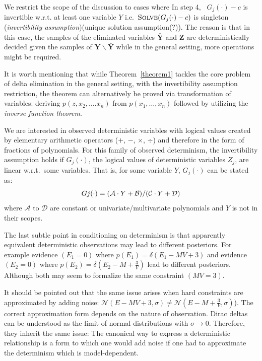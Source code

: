 \documentclass{article}
\newcommand{\bvec}[1]{\textbf{#1}}
\newcommand{\pr}{p}
\begin{document}
We restrict the scope of the discussion to cases where  
In step 4, \ $G_j(\cdot) - c$ is invertible w.r.t. at least one variable $Y$ 
i.e.\ $\textsc{Solve}(G_j(\cdot)-c)$ is singleton (\emph{invertibility assumption}){\color{red}(unique solution assumption(?))}.
The reason is that in this case, 
 the samples of the eliminated variables $\bar{\bvec{Y}}$ and $\bvec{Z}$ 
are deterministically decided given the samples of $\bvec{Y}\backslash \bar{\bvec{Y}}$ while in the general setting, more operations might be required.
%

It is worth mentioning that while Theorem~\ref{theorem1} tackles the core problem of delta elimination in the general setting,
with the invertibility assumption restriction, the theorem can alternatively be proved via transformation of variables: 
deriving $\pr(z, x_2, \ldots. x_n)$ from $\pr(x_1, \ldots, x_n)$ followed by utilizing the \emph{inverse function theorem}.  

We are interested in observed deterministic variables with logical values  
created by elementary arithmetic operators ($+$, $-$, $\times$, $\div$) and therefore 
in the form of fractions of polynomials.
For this family of observed determinism, the invertibility assumption holds
if $G_j(\cdot)$, the logical values of deterministic variables $Z_j$, are linear w.r.t.\ some variables. 
That is, for some variable $Y$, $G_j(\cdot)$ can be stated as: 
\begin{equation}\footnotesize
\label{eq:evidence-form}
Gj(\cdot) = 
{(\mathcal{A} \cdot Y + \mathcal{B})}/{(\mathcal{C} \cdot Y + \mathcal{D})}
\end{equation}
where $\mathcal{A}$ to $\mathcal{D}$ are constant or univariate/multivariate polynomials and $Y$ is not in their scopes.





The last subtle point in conditioning on determinism is that apparently equivalent deterministic observations may lead to different posteriors. For example evidence $(E_1 = 0)$ where $\pr(E_1)= \delta(E_1 - M V + 3)$ and 
evidence $(E_2 = 0)$ where $\pr(E_2) = \delta(E_2 - M + \frac{3}{V})$ lead to different posteriors. 
Although both may seem to formalize the same constraint $(MV = 3)$.

It should be pointed out that the same issue arises when hard constraints are approximated by adding noise:
$\mathcal{N}(E - MV + 3, \sigma) \neq \mathcal{N}(E -M + \frac{3}{V}, \sigma)$).
The correct approximation form depends on the nature of observation.
Dirac deltas can be understood as the limit of normal distributions with $\sigma \rightarrow 0$.
Therefore, they inherit the same issue: 
The canonical way to express a deterministic relationship is a form to which one would add noise if one had to approximate the determinism which is model-dependent. 
  
\end{document}
